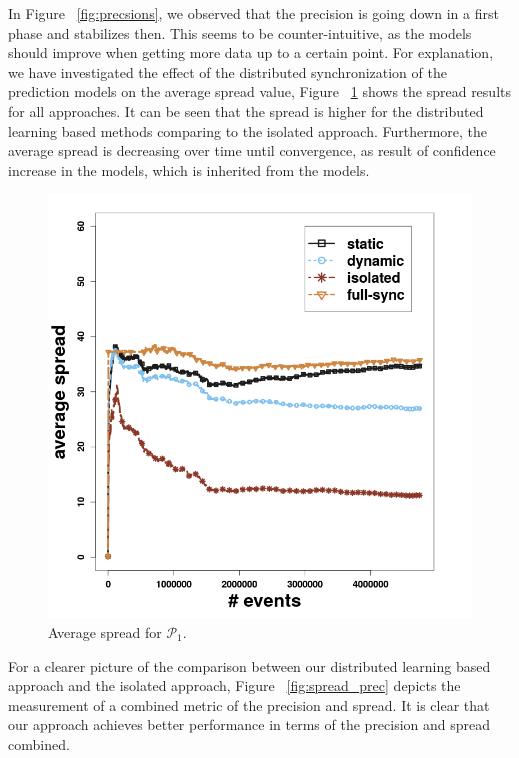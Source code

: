 \par In Figure ~\ref{fig:precsions}, we observed that the precision is going down in a first phase and stabilizes then. This seems to be counter-intuitive, as the models should improve when getting more data up to a certain point. For explanation, we have investigated the effect of the distributed synchronization of the prediction models on the average spread value, Figure  ~\ref{fig:spread}  shows the spread results for all approaches. It can be seen that the spread is higher for the distributed learning based methods comparing to the isolated approach. Furthermore, the average spread is decreasing over time until convergence, as result of confidence increase in the models, which is inherited from the \pmcmr models. 

\begin{center}
	
	\begin{figure}[H]
		
		\includegraphics[width=\textwidth,height=.62\textheight]{chapters/figures/synopses/p1_spread_100_2_08.png}
		
		\caption{Average spread for $\mathcal{P}_1$.}
		\label{fig:spread}
	\end{figure}
\end{center}


\par For a clearer picture of the comparison between our distributed learning based approach and the isolated approach, Figure ~\ref{fig:spread_prec} depicts the measurement of a combined metric of the precision and spread. It is clear that our approach achieves better performance in terms of the precision and spread combined.  

